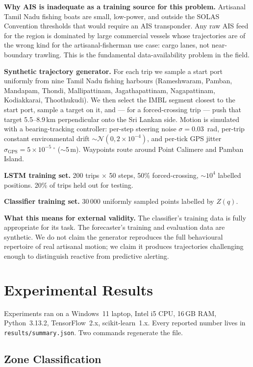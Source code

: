 \documentclass[conference]{IEEEtran}
\begin{document}
\textbf{Why AIS is inadequate as a training source for this problem.} Artisanal Tamil Nadu fishing boats are small, low-power, and outside the SOLAS Convention thresholds that would require an AIS transponder. Any raw AIS feed for the region is dominated by large commercial vessels whose trajectories are of the wrong kind for the artisanal-fisherman use case: cargo lanes, not near-boundary trawling. This is the fundamental data-availability problem in the field.

\textbf{Synthetic trajectory generator.} For each trip we sample a start port uniformly from nine Tamil Nadu fishing harbours (Rameshwaram, Pamban, Mandapam, Thondi, Mallipattinam, Jagathapattinam, Nagapattinam, Kodiakkarai, Thoothukudi). We then select the IMBL segment closest to the start port, sample a target on it, and --- for a forced-crossing trip --- push that target 5.5--8.9\,km perpendicular onto the Sri Lankan side. Motion is simulated with a bearing-tracking controller: per-step steering noise $\sigma = 0.03$~rad, per-trip constant environmental drift $\sim\mathcal{N}(0, 2{\times}10^{-4})$, and per-tick GPS jitter $\sigma_{\text{GPS}} = 5{\times}10^{-5}~^\circ$ ($\sim$5\,m). Waypoints route around Point Calimere and Pamban Island.

\textbf{LSTM training set.} 200 trips $\times$ 50 steps, 50\% forced-crossing, $\sim 10^4$ labelled positions. 20\% of trips held out for testing.

\textbf{Classifier training set.} 30\,000 uniformly sampled points labelled by $Z(q)$.

\textbf{What this means for external validity.} The classifier's training data is fully appropriate for its task. The forecaster's training and evaluation data are synthetic. We do not claim the generator reproduces the full behavioural repertoire of real artisanal motion; we claim it produces trajectories challenging enough to distinguish reactive from predictive alerting.

\section{Experimental Results}\label{sec:results}

Experiments ran on a Windows~11 laptop, Intel i5 CPU, 16\,GB RAM, Python~3.13.2, TensorFlow~2.x, scikit-learn~1.x. Every reported number lives in \texttt{results/summary.json}. Two commands regenerate the file.

\subsection{Zone Classification}
\end{document}
